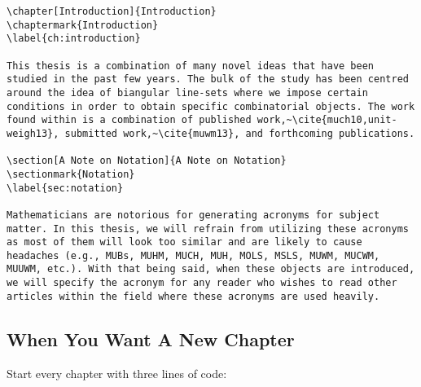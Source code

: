 \vskip-10pt
\lstset{numberstyle=\scriptsize\ttfamily, numbersep=10pt, captionpos=b}
\lstset{basicstyle=\small\ttfamily}
\lstset{framesep=2pt}
\lstset{breaklines=true} 
\begin{singlespace}
\begin{lstlisting}
\chapter[Introduction]{Introduction}
\chaptermark{Introduction}
\label{ch:introduction}

This thesis is a combination of many novel ideas that have been studied in the past few years. The bulk of the study has been centred around the idea of biangular line-sets where we impose certain conditions in order to obtain specific combinatorial objects. The work found within is a combination of published work,~\cite{much10,unit-weigh13}, submitted work,~\cite{muwm13}, and forthcoming publications.

\section[A Note on Notation]{A Note on Notation}
\sectionmark{Notation}
\label{sec:notation}

Mathematicians are notorious for generating acronyms for subject matter. In this thesis, we will refrain from utilizing these acronyms as most of them will look too similar and are likely to cause headaches (e.g., MUBs, MUHM, MUCH, MUH, MOLS, MSLS, MUWM, MUCWM, MUUWM, etc.). With that being said, when these objects are introduced, we will specify the acronym for any reader who wishes to read other articles within the field where these acronyms are used heavily.
\end{lstlisting}
\end{singlespace}

\subsection{When You Want A New Chapter}

Start every chapter with three lines of code:

